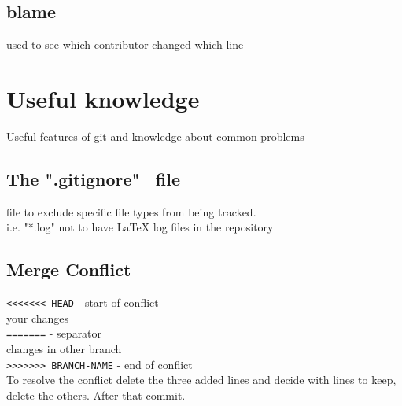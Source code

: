 \subsection*{blame}
used to see which contributor changed which line \\


\section*{Useful knowledge}
Useful features of git and knowledge about common problems
\subsection*{The ".gitignore" \ file}
file to exclude specific file types from being tracked.\\
i.e. "*.log" not to have LaTeX log files in the repository\\

\subsection*{Merge Conflict}
\texttt{<<<<<<< HEAD} - start of conflict\\
your changes\\
\texttt{=======} - separator \\
changes in other branch \\
\texttt{>>>>>>> BRANCH-NAME} - end of conflict\\
To resolve the conflict delete the three added lines and decide with lines to keep, delete the others. After that commit.


